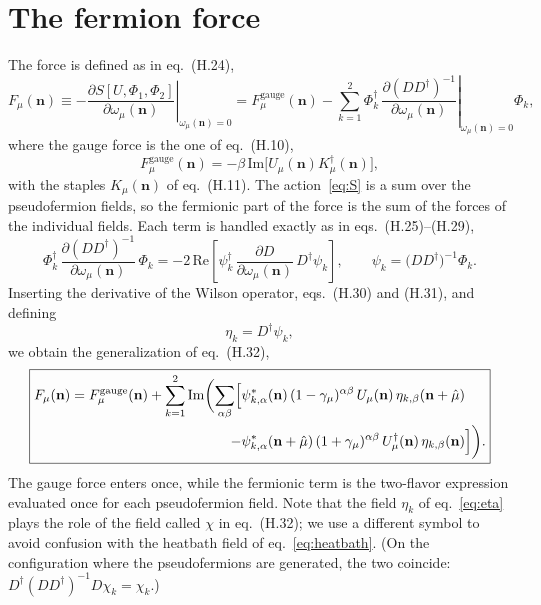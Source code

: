\documentclass[11pt,a4paper]{article}
\newcommand{\n}{\mathbf{n}}
\begin{document}
\section{The fermion force}
\label{sec:force}

The force is defined as in eq.~(H.24),
\begin{equation}
    F_\mu(\n) \equiv -\left.\frac{\partial S[U,\Phi_1,\Phi_2]}{\partial\omega_\mu(\n)}\right|_{\omega_\mu(\n)=0}
    = F_\mu^{\mathrm{gauge}}(\n)
    - \sum_{k=1}^{2} \Phi_k^\dagger\,
      \left.\frac{\partial (DD^\dagger)^{-1}}{\partial\omega_\mu(\n)}\right|_{\omega_\mu(\n)=0}\Phi_k ,
    \label{eq:F_def}
\end{equation}
where the gauge force is the one of eq.~(H.10),
\begin{equation}
    F_\mu^{\mathrm{gauge}}(\n) = -\beta\,\mathrm{Im}\bigl[U_\mu(\n)K_\mu^\dagger(\n)\bigr],
\end{equation}
with the staples $K_\mu(\n)$ of eq.~(H.11). The action~\eqref{eq:S} is a sum over the pseudofermion fields, so
the fermionic part of the force is the sum of the forces of the individual fields. Each term is handled exactly as
in eqs.~(H.25)--(H.29),
\begin{equation}
    \Phi_k^\dagger\,\frac{\partial (DD^\dagger)^{-1}}{\partial\omega_\mu(\n)}\,\Phi_k
    = -2\,\mathrm{Re}\left[\psi_k^\dagger\,\frac{\partial D}{\partial\omega_\mu(\n)}\,D^\dagger\psi_k\right],
    \qquad
    \psi_k = \bigl(DD^\dagger\bigr)^{-1}\Phi_k .
    \label{eq:F_k}
\end{equation}
Inserting the derivative of the Wilson operator, eqs.~(H.30) and (H.31), and defining
\begin{equation}
    \eta_k = D^\dagger\psi_k ,
    \label{eq:eta}
\end{equation}
we obtain the generalization of eq.~(H.32),
\begin{equation}
    \boxed{
    \begin{aligned}
    F_\mu(\n) = F_\mu^{\mathrm{gauge}}(\n)
    + \sum_{k=1}^{2} \mathrm{Im}\biggl(\sum_{\alpha\beta}\Bigl[
      &\psi_{k,\alpha}^*(\n)\,(1-\gamma_\mu)^{\alpha\beta}\,U_\mu(\n)\,\eta_{k,\beta}(\n+\hat\mu) \\
    - &\psi_{k,\alpha}^*(\n+\hat\mu)\,(1+\gamma_\mu)^{\alpha\beta}\,U_\mu^\dagger(\n)\,\eta_{k,\beta}(\n)
    \Bigr]\biggr).
    \end{aligned}
    }
    \label{eq:F}
\end{equation}
The gauge force enters once, while the fermionic term is the two-flavor expression evaluated once for each
pseudofermion field. Note that the field $\eta_k$ of eq.~\eqref{eq:eta} plays the role of the field called $\chi$ in
eq.~(H.32); we use a different symbol to avoid confusion with the heatbath field of eq.~\eqref{eq:heatbath}.
(On the configuration where the pseudofermions are generated, the two coincide:
$D^\dagger(DD^\dagger)^{-1}D\chi_k = \chi_k$.)
\end{document}
